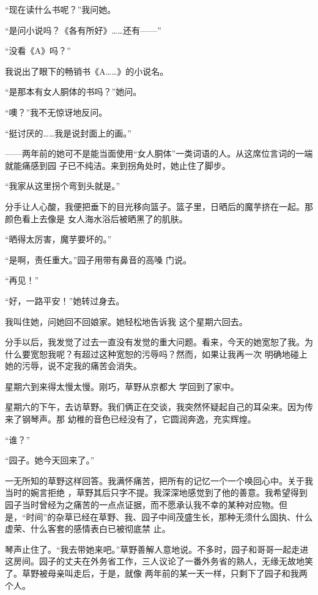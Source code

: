 \documentclass{article}
\begin{document}
“现在读什么书呢？”我问她。 

“是问小说吗？《各有所好》……还有——”


“没看《A》吗？” 

我说出了眼下的畅销书《A……》的小说名。


“是那本有女人胴体的书吗？”她问。 


“噢？”我不无惊讶地反问。 

\newpage


“挺讨厌的……我是说封面上的画。” 

——两年前的她可不是能当面使用“女人胴体”一类词语的人。从这席位言词的一端就能痛感到园
子已不纯洁。来到拐角处时，她止住了脚步。 


“我家从这里拐个弯到头就是。” 

分手让人心酸，我便把垂下的目光移向篮子。篮子里，日晒后的魔芋挤在一起。那颜色看上去像是
女人海水浴后被晒黑了的肌肤。 


“晒得太厉害，魔芋要坏的。” 

“是啊，责任重大。”园子用带有鼻音的高嗓
门说。 


“再见！” 


“好，一路平安！”她转过身去。 

\newpage

我叫住她，问她回不回娘家。她轻松地告诉我
这个星期六回去。 

分手以后，我发觉了过去一直没有发觉的重大问题。看来，今天的她宽恕了我。为什么要宽恕我呢？有超过这种宽恕的污辱吗？然而，如果让我再一次
明确地碰上她的污辱，说不定我的痛苦会消失。 

星期六到来得太慢太慢。刚巧，草野从京都大
学回到了家中。 

星期六的下午，去访草野。我们俩正在交谈，我突然怀疑起自己的耳朵来。因为传来了钢琴声。那
幼稚的音色已经没有了，它圆润奔逸，充实辉煌。 


“谁？” 


“园子。她今天回来了。” 

一无所知的草野这样回答。我满怀痛苦，把所有的记忆一个一个唤回心中。关于我当时的婉言拒绝
\newpage
，草野其后只字不提。我深深地感觉到了他的善意。我希望得到园子当时曾经为之痛苦的一点点证据，而不愿承认我不幸的某种对应物。但是，“时间”的杂草已经在草野、我、园子中间茂盛生长，那种无须什么固执、什么虚荣、什么客套的感情表白已被彻底禁
止。 

琴声止住了。“我去带她来吧。”草野善解人意地说。不多时，园子和哥哥一起走进这房间。园子的丈夫在外务省工作，三人议论了一番外务省的熟人，无缘无故地笑了。草野被母亲叫走后，于是，就像
两年前的某一天一样，只剩下了园子和我两个人。 
\end{document}
